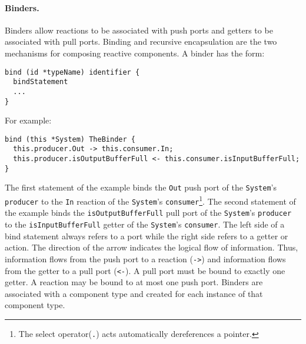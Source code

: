 \paragraph{Binders.}
Binders allow reactions to be associated with push ports and getters to be associated with pull ports.
Binding and recursive encapsulation are the two mechanisms for composing reactive components.
A binder has the form:
\begin{verbatim}
bind (id *typeName) identifier {
  bindStatement
  ...
}
\end{verbatim}
For example:
\begin{verbatim}
bind (this *System) TheBinder {
  this.producer.Out -> this.consumer.In;
  this.producer.isOutputBufferFull <- this.consumer.isInputBufferFull;
}
\end{verbatim}
The first statement of the example binds the \verb+Out+ push port of the \verb+System+'s \verb+producer+ to the \verb+In+ reaction of the \verb+System+'s \verb+consumer+\footnote{The select operator(\texttt{.}) acts automatically dereferences a pointer.}.
The second statement of the example binds the \verb+isOutputBufferFull+ pull port of the \verb+System+'s \verb+producer+ to the \verb+isInputBufferFull+ getter of the \verb+System+'s \verb+consumer+.
The left side of a bind statement always refers to a port while the right side refers to a getter or action.
The direction of the arrow indicates the logical flow of information.
Thus, information flows from the push port to a reaction (\verb+->+) and information flows from the getter to a pull port (\verb+<-+).
A pull port must be bound to exactly one getter.
A reaction may be bound to at most one push port.
Binders are associated with a component type and created for each instance of that component type.

